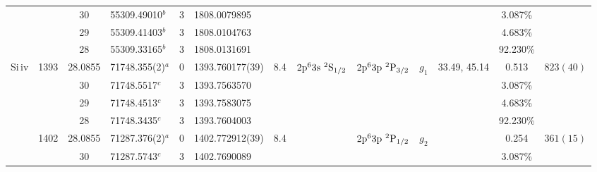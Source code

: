 \begin{table*}
\begin{center}
{\begin{tabular}{:l;l;c;l;c;l;c;l;l;c;c;c;c}
\rowstyle{\itshape}               &        & 30        & 55309.49010$^{b}$                & 3 &  1808.0079895      &      & $                                        $ & $                                        $ & $      $ &              & 3.087\%   & $          $\\
\rowstyle{\itshape}               &        & 29        & 55309.41403$^{b}$                & 3 &  1808.0104763      &      & $                                        $ & $                                        $ & $      $ &              & 4.683\%   & $          $\\
\rowstyle{\itshape}               &        & 28        & 55309.33165$^{b}$                & 3 &  1808.0131691      &      & $                                        $ & $                                        $ & $      $ &              & 92.230\%  & $          $\\
                    Si{\sc \,iv}  & 1393   & 28.0855   & 71748.355(2)$^{a}$               & 0 &   1393.760177(39)  &  8.4 & $2\rm{p}^63\rm{s}~^2\rm{S}_{1/2}         $ & $2\rm{p}^63\rm{p}~^2\rm{P}_{3/2}         $ & $g_{1} $ & 33.49, 45.14 & 0.513     & $  823(40) $\\
\rowstyle{\itshape}               &        & 30        & 71748.5517$^{c}$                 & 3 &  1393.7563570      &      & $                                        $ & $                                        $ & $      $ &              & 3.087\%   & $          $\\
\rowstyle{\itshape}               &        & 29        & 71748.4513$^{c}$                 & 3 &  1393.7583075      &      & $                                        $ & $                                        $ & $      $ &              & 4.683\%   & $          $\\
\rowstyle{\itshape}               &        & 28        & 71748.3435$^{c}$                 & 3 &  1393.7604003      &      & $                                        $ & $                                        $ & $      $ &              & 92.230\%  & $          $\\
                                  & 1402   & 28.0855   & 71287.376(2)$^{a}$               & 0 &   1402.772912(39)  &  8.4 & $                                        $ & $2\rm{p}^63\rm{p}~^2\rm{P}_{1/2}         $ & $g_{2} $ &              & 0.254     & $  361(15) $\\
\rowstyle{\itshape}               &        & 30        & 71287.5743$^{c}$                 & 3 &  1402.7690089      &      & $                                        $ & $                                        $ & $      $ &              & 3.087\%   & $          $\\

\end{tabular}}
\end{center}
\end{table*}
